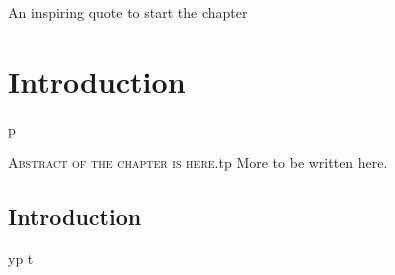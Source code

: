 
\begin{savequote}[65mm]
An inspiring quote to start the chapter
\end{savequote}

\chapter{Introduction}
\label{chap:intro}p

\lettrine[lines=3]{\textcolor{SchoolColor}{A}}{bstract of the chapter is here}.tp
More to be written here.
\lipsum[1]

\section{Introduction}
yp
\lipsum[3-5]t
\cite{1}